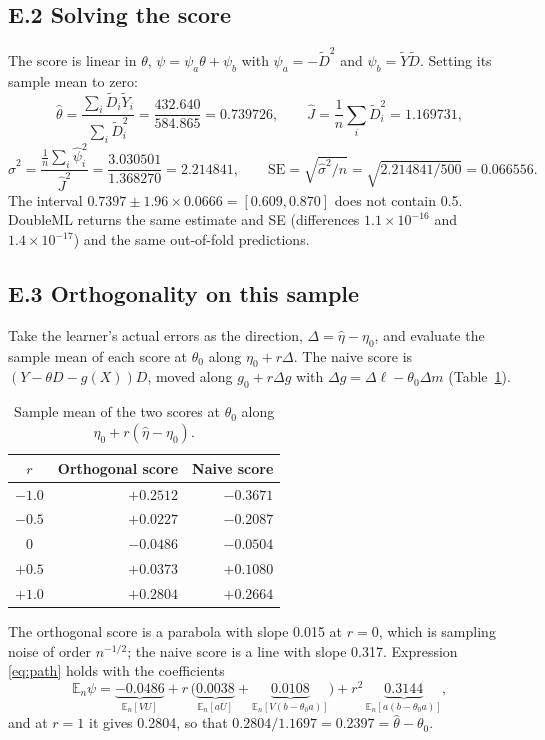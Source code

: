 \documentclass[11pt,a4paper]{article}
\newcommand{\En}{\mathbb{E}_n}
\begin{document}
\subsection*{E.2 Solving the score}

The score is linear in $\theta$, $\psi=\psi_a\theta+\psi_b$ with $\psi_a=-\tilde D^2$ and $\psi_b=\tilde Y\tilde D$. Setting its sample mean to zero:
\[
\hat\theta=\frac{\sum_i\tilde D_i\tilde Y_i}{\sum_i\tilde D_i^2}=\frac{432.640}{584.865}=0.739726,\qquad \hat J=\frac1n\sum_i\tilde D_i^2=1.169731,
\]
\[
\hat\sigma^2=\frac{\frac1n\sum_i\hat\psi_i^2}{\hat J^2}=\frac{3.030501}{1.368270}=2.214841,\qquad \mathrm{SE}=\sqrt{\hat\sigma^2/n}=\sqrt{2.214841/500}=0.066556.
\]
The interval $0.7397\pm1.96\times0.0666=[0.609,0.870]$ does not contain 0.5. DoubleML returns the same estimate and SE (differences $1.1\times10^{-16}$ and $1.4\times10^{-17}$) and the same out-of-fold predictions.

\subsection*{E.3 Orthogonality on this sample}

Take the learner's actual errors as the direction, $\Delta=\hat\eta-\eta_0$, and evaluate the sample mean of each score at $\theta_0$ along $\eta_0+r\Delta$. The naive score is $(Y-\theta D-g(X))D$, moved along $g_0+r\Delta g$ with $\Delta g=\Delta\ell-\theta_0\Delta m$ (Table~\ref{tab:orthnum}).

\begin{table}[H]
\centering\small
\caption{Sample mean of the two scores at $\theta_0$ along $\eta_0+r(\hat\eta-\eta_0)$.}\label{tab:orthnum}
\begin{tabular}{crr}
\toprule
$r$ & Orthogonal score & Naive score\\
\midrule
$-1.0$ & $+0.2512$ & $-0.3671$\\
$-0.5$ & $+0.0227$ & $-0.2087$\\
$0$ & $-0.0486$ & $-0.0504$\\
$+0.5$ & $+0.0373$ & $+0.1080$\\
$+1.0$ & $+0.2804$ & $+0.2664$\\
\bottomrule
\end{tabular}
\end{table}

The orthogonal score is a parabola with slope 0.015 at $r=0$, which is sampling noise of order $n^{-1/2}$; the naive score is a line with slope 0.317. Expression \eqref{eq:path} holds with the coefficients
\[
\En\psi=\underbrace{-0.0486}_{\En[VU]}+r\,\big(\underbrace{0.0038}_{\En[aU]}+\underbrace{0.0108}_{\En[V(b-\theta_0a)]}\big)+r^2\,\underbrace{0.3144}_{\En[a(b-\theta_0a)]},
\]
and at $r=1$ it gives 0.2804, so that $0.2804/1.1697=0.2397=\hat\theta-\theta_0$.
\end{document}
